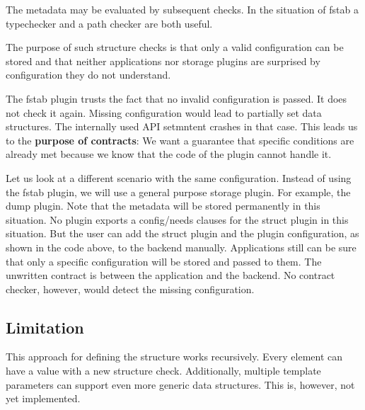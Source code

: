 The metadata may be evaluated by subsequent checks. In the situation of fstab a typechecker and a path checker are both useful.

The purpose of such structure checks is that only a valid configuration can be stored and that neither applications nor storage plugins are surprised by configuration they do not understand.

The fstab plugin trusts the fact that no invalid configuration is passed. It does not check it again. Missing configuration would lead to partially set data structures. The internally used A\+P\+I {\ttfamily setmntent} crashes in that case. This leads us to the {\bfseries purpose of contracts}\+: We want a guarantee that specific conditions are already met because we know that the code of the plugin cannot handle it.

Let us look at a different scenario with the same configuration. Instead of using the fstab plugin, we will use a general purpose storage plugin. For example, the dump plugin. Note that the metadata will be stored permanently in this situation. No plugin exports a {\ttfamily config/needs} clauses for the struct plugin in this situation. But the user can add the struct plugin and the plugin configuration, as shown in the code above, to the backend manually. Applications still can be sure that only a specific configuration will be stored and passed to them. The unwritten contract is between the application and the backend. No contract checker, however, would detect the missing configuration.

\subsection*{Limitation}

This approach for defining the structure works recursively. Every element can have a value with a new structure check. Additionally, multiple template parameters can support even more generic data structures. This is, however, not yet implemented. 